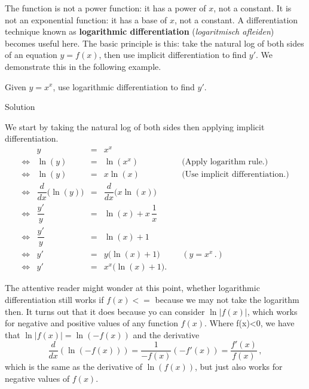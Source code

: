 The function is not a power function: it has a power of $x$, not a constant. It is not an exponential function: it has a base of $x$, not a constant.  A differentiation technique known as \textbf{logarithmic differentiation} (\textit{logaritmisch afleiden}) becomes useful here. The basic principle is this: take the natural log of both sides of an equation $y=f(x)$, then use implicit differentiation to find $y'$. We demonstrate this in the following example.


\begin{example}\label{ex_implicit10}
Given $y=x^x$, use logarithmic differentiation to find $y'$.

\pagebreak
{}Solution 

We start by taking the natural log of both sides then applying implicit differentiation.
$$
\begin{array}{rrcll}
&y &=& x^x \\
\Leftrightarrow&\ln (y) &=& \ln (x^x)&\quad\text{(Apply logarithm rule.)}\\
\Leftrightarrow&\ln (y) &=& x\ln (x)& \quad\text{(Use implicit differentiation.)}\\ 
\Leftrightarrow&\dfrac{d}{dx}\Big(\ln (y)\Big) &=& \dfrac{d}{dx}\Big(x\ln (x)\Big) &\\[0.2cm]
\Leftrightarrow&\dfrac{y'}{y} &=& \ln (x) + x\,\dfrac1x&\\[0.2cm]
\Leftrightarrow&\dfrac{y'}{y} &=& \ln (x) + 1&\\
\Leftrightarrow&y' &=& y\big(\ln (x)+1\big)& \quad(y=x^x\,.)\\
\Leftrightarrow&y' &=& x^x\big(\ln (x)+1\big).
\end{array}
$$

\end{example}

\ifanalysis
The attentive reader might wonder at this point, whether logarithmic differentiation still works if $f(x)<=$ because we may not take the logarithm then. It turns out that it does because yo can consider $\ln|f(x)|$, which works for negative and positive values of any function $f(x)$. Where f(x)<0, we have that 
$
\ln|f(x)|=\ln(-f(x))
$
and the derivative
$$
\dfrac{d}{dx}\left(\ln(-f(x))\right)=\dfrac{1}{-f(x)}(-f'(x))=\dfrac{f'(x)}{f(x)}\,,
$$
which is the same as the derivative of $\ln(f(x))$, but just also works for negative values of $f(x)$. 
\fi

\fi



